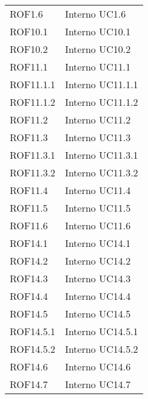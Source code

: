 \begin{longtable}{p{2.5cm}!{\VRule[1pt]}p{2.5cm}}
 \\
ROF1.6 & Interno \newline UC1.6
 \\
ROF10.1 & Interno \newline UC10.1
 \\
ROF10.2 & Interno \newline UC10.2
 \\
ROF11.1 & Interno \newline UC11.1
 \\
ROF11.1.1 & Interno \newline UC11.1.1
 \\
ROF11.1.2 & Interno \newline UC11.1.2
 \\
ROF11.2 & Interno \newline UC11.2
 \\
ROF11.3 & Interno \newline UC11.3
 \\
ROF11.3.1 & Interno \newline UC11.3.1
 \\
ROF11.3.2 & Interno \newline UC11.3.2
 \\
ROF11.4 & Interno \newline UC11.4
 \\
ROF11.5 & Interno \newline UC11.5
 \\
ROF11.6 & Interno \newline UC11.6
 \\
ROF14.1 & Interno \newline UC14.1
 \\
ROF14.2 & Interno \newline UC14.2
 \\
ROF14.3 & Interno \newline UC14.3
 \\
ROF14.4 & Interno \newline UC14.4
 \\
ROF14.5 & Interno \newline UC14.5
 \\
ROF14.5.1 & Interno \newline UC14.5.1
 \\
ROF14.5.2 & Interno \newline UC14.5.2
 \\
ROF14.6 & Interno \newline UC14.6
 \\
ROF14.7 & Interno \newline UC14.7

\end{longtable}
